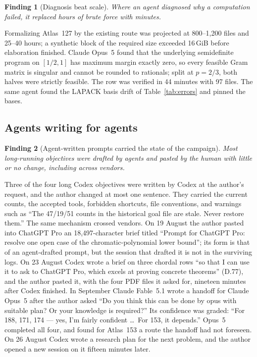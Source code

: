 \documentclass[11pt,a4paper]{article}
\newtheorem{finding}{Finding}
\begin{document}
\begin{finding}[Diagnosis beat scale]\label{f:diagnosis}
Where an agent diagnosed why a computation failed, it replaced hours of brute force with minutes.
\end{finding}
Formalizing Atlas~127 by the existing route was projected at 800--1,200 files and 25--40 hours; a synthetic
block of the required size exceeded 16\,GiB before elaboration finished. Claude Opus~5 found that the
underlying semidefinite program on $[1/2,1]$ has maximum margin exactly zero, so every feasible Gram matrix is
singular and cannot be rounded to rationals; split at $p=2/3$, both halves were strictly feasible. The row was
verified in 44 minutes with 97 files. The same agent found the LAPACK basis drift of Table~\ref{tab:errors}
and pinned the bases.

\subsection{Agents writing for agents}

\begin{finding}[Agent-written prompts carried the state of the campaign]\label{f:prompts}
Most long-running objectives were drafted by agents and pasted by the human with little or no change,
including across vendors.
\end{finding}
Three of the four long Codex objectives were written by Codex at the author's request, and the author changed
at most one sentence. They carried the current counts, the accepted tools, forbidden shortcuts, file
conventions, and warnings such as ``The 47/19/51 counts in the historical goal file are stale. Never restore
them.'' The same mechanism crossed vendors. On 19 August the author pasted into ChatGPT Pro an 18,497-character
brief titled ``Prompt for ChatGPT Pro: resolve one open case of the chromatic-polynomial lower bound''; its
form is that of an agent-drafted prompt, but the session that drafted it is not in the surviving logs. On
23 August Codex wrote a brief on three chordal rows ``so that I can use it to ask to ChatGPT Pro, which excels at
proving concrete theorems'' (D.77), and the author pasted it, with the four PDF files it asked for, nineteen
minutes after Codex finished. In September Claude Fable~5.1 wrote a handoff for Claude Opus~5 after the author
asked ``Do you think this can be done by opus with suitable plan? Or your knowledge is required?'' Its
confidence was graded: ``For 188, 171, 174 --- yes, I'm fairly confident \dots\ For 153, it depends.'' Opus~5
completed all four, and found for Atlas~153 a route the handoff had not foreseen. On 26 August Codex wrote a
research plan for the next problem, and the author opened a new session on it fifteen minutes later.
\end{document}
